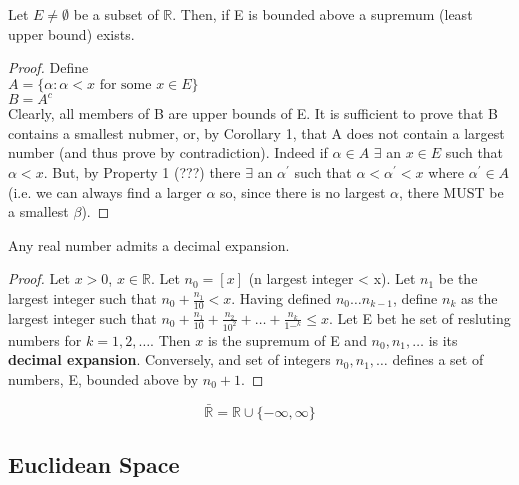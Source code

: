 \documentclass[11pt,fleqn]{book} %
\begin{document}
\begin{corollary}	
	Let $E \neq \emptyset$ be a subset of $\mathbb{R}$. Then, if E is bounded above a supremum (least upper bound) exists.
\end{corollary}	

\begin{proof}
	Define \\
	$A = \{\alpha: \alpha < x \text{ for some }x \in E\}$\\
	$B = A^c$\\
	Clearly, all members of B are upper bounds of E. It is sufficient to prove that B contains a smallest nubmer, or, by Corollary 1, that A does not contain a largest number (and thus prove by contradiction). Indeed if $\alpha \in A$ $\exists$ an $x \in E$ such that $\alpha < x$. But, by Property 1 (???) there $\exists$ an $\alpha^\prime$ such that $\alpha < \alpha^\prime < x$ where $\alpha^\prime \in A $ (i.e. we can always find a larger $\alpha$ so, since there is no largest $\alpha$, there MUST be a smallest $\beta$).  
\end{proof}

\begin{theorem}
	Any real number admits a decimal expansion.
\end{theorem}

\begin{proof}
	Let $x > 0$, $x \in \mathbb{R}$. Let $n_0 = [x]$ (n largest integer < x). Let $n_1$ be the largest integer such that $n_0 + \frac{n_1}{10} < x$. Having defined $n_0 \dots n_{k-1}$, define $n_k$ as the largest integer such that $n_0 + \frac{n_1}{10} + \frac{n_2}{10^2} + \dots + \frac{n_k}{1-^k} \le x$. Let E bet he set of resluting numbers for $k=1,2,\dots$. Then $x$ is the supremum of E and $n_0, n_1, \dots$ is its \textbf{decimal expansion}. Conversely, and set of integers $n_0, n_1, \dots$ defines a set of numbers, E, bounded above by $n_0 + 1$.	
\end{proof}

\begin{definition}
	$$\bar{\mathbb{R}} = \mathbb{R} \cup \{-\infty, \infty\}$$
\end{definition}

\subsection{Euclidean Space}
\end{document}
